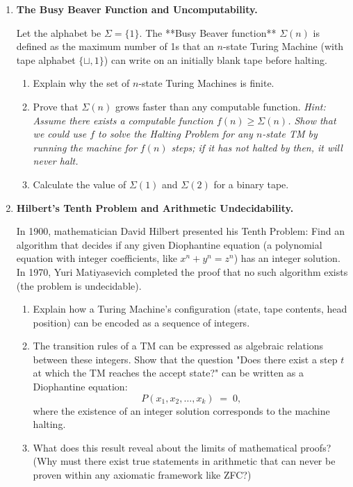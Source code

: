 \documentclass[12pt, a4paper]{book}
\begin{document}
\begin{deepbox}
\begin{enumerate}[label=\textbf{D\arabic*.}]
  \item \textbf{The Busy Beaver Function and Uncomputability.}
  
        Let the alphabet be $\Sigma = \{1\}$.
        The **Busy Beaver function** $\Sigma(n)$ is defined as the maximum number of 1s that an $n$-state Turing Machine (with tape alphabet $\{\sqcup, 1\}$) can write on an initially blank tape before halting.
        
        \begin{enumerate}[label=(\alph*)]
          \item Explain why the set of $n$-state Turing Machines is finite.
          \item Prove that $\Sigma(n)$ grows faster than any computable function.
                \textit{Hint: Assume there exists a computable function $f(n) \ge \Sigma(n)$. Show that we could use $f$ to solve the Halting Problem for any $n$-state TM by running the machine for $f(n)$ steps; if it has not halted by then, it will never halt.}
          \item Calculate the value of $\Sigma(1)$ and $\Sigma(2)$ for a binary tape.
        \end{enumerate}

  \item \textbf{Hilbert's Tenth Problem and Arithmetic Undecidability.}
  
        In 1900, mathematician David Hilbert presented his Tenth Problem: Find an algorithm that decides if any given Diophantine equation (a polynomial equation with integer coefficients, like $x^n + y^n = z^n$) has an integer solution.
        In 1970, Yuri Matiyasevich completed the proof that no such algorithm exists (the problem is undecidable).
        
        \begin{enumerate}[label=(\alph*)]
          \item Explain how a Turing Machine's configuration (state, tape contents, head position) can be encoded as a sequence of integers.
          \item The transition rules of a TM can be expressed as algebraic relations between these integers.
                Show that the question "Does there exist a step $t$ at which the TM reaches the accept state?" can be written as a Diophantine equation:
                \[
                  P(x_1, x_2, \dots, x_k) \;=\; 0,
                \]
                where the existence of an integer solution corresponds to the machine halting.
          \item What does this result reveal about the limits of mathematical proofs? (Why must there exist true statements in arithmetic that can never be proven within any axiomatic framework like ZFC?)
        \end{enumerate}
\end{enumerate}
\end{deepbox}
\end{document}

